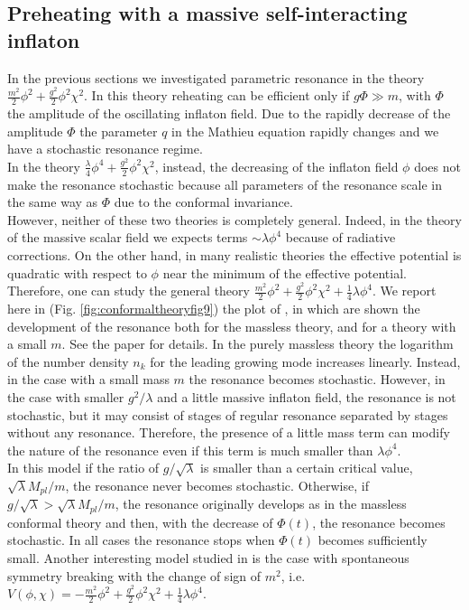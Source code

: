 \documentclass[11pt,a4paper,twoside]{book}
\begin{document}
\subsection{Preheating with a massive self-interacting inflaton}
In the previous sections we investigated parametric resonance in the theory $ \frac{m^{2}}{2}\phi^{2} + \frac{g^{2}}{2}\phi^{2}\chi^{2} $. In this theory reheating can be efficient only if $ g\Phi \gg m $, with $\Phi$ the amplitude of the oscillating inflaton field. Due to the rapidly decrease of the amplitude $\Phi$ the parameter $ q $ in the Mathieu equation rapidly changes and we have a stochastic resonance regime.\\
In the theory $ \frac{\lambda}{4}\phi^{4} + \frac{g^{2}}{2}\phi^{2}\chi^{2} $, instead, the decreasing of the inflaton field $\phi$ does not make the resonance stochastic because all parameters of the resonance scale in the same way as $\Phi$ due to the conformal invariance.\\
However, neither of these two theories is completely general. Indeed, in the theory of the massive scalar field we expects terms $\sim \lambda \phi^{4}$ because of radiative corrections. On the other hand, in many realistic theories the effective potential is quadratic with respect to $\phi$ near the minimum of the effective potential. Therefore, one can study the general theory  $\frac{m^{2}}{2}\phi^{2} + \frac{g^{2}}{2}\phi^{2}\chi^{2} +\frac{1}{4} \lambda \phi^{4} $. We report here in (Fig. \ref{fig:conformaltheoryfig9}) the plot of \cite{Chap4:ModelLambdaPhi4Reference}, in which are shown the development of the resonance both for the massless theory, and for a theory with a small $ m $. See the paper for details. In the purely massless theory the logarithm of the number density $ n_{k} $ for the leading growing mode increases linearly. Instead, in the case with a small mass $ m $ the resonance becomes stochastic. However, in the case with smaller $ g^{2}/\lambda $  and a little massive inflaton field, the resonance is not stochastic, but it may consist of stages of regular resonance separated by stages without any resonance. Therefore, the presence of a little mass term can modify the nature of the resonance even if this term is much smaller than $ \lambda \phi^{4} $.\\
In this model if the ratio of $ g/\sqrt{\lambda} $ is smaller than a certain critical value, $ \sqrt{\lambda}M_{pl}/m $, the resonance never becomes stochastic. Otherwise, if $g/\sqrt{\lambda} > \sqrt{\lambda}M_{pl}/m $, the resonance originally develops as in the massless conformal theory and then, with the decrease of $ \Phi(t) $, the resonance becomes stochastic. In all cases the resonance stops when $ \Phi(t) $ becomes sufficiently small. Another interesting model studied in \cite{Chap4:ModelLambdaPhi4Reference} is the case with spontaneous symmetry breaking with the change of sign of $ m^{2} $, i.e.  $V(\phi,\chi)= -\frac{m^{2}}{2}\phi^{2} + \frac{g^{2}}{2}\phi^{2}\chi^{2} +\frac{1}{4} \lambda \phi^{4} $.
\end{document}
